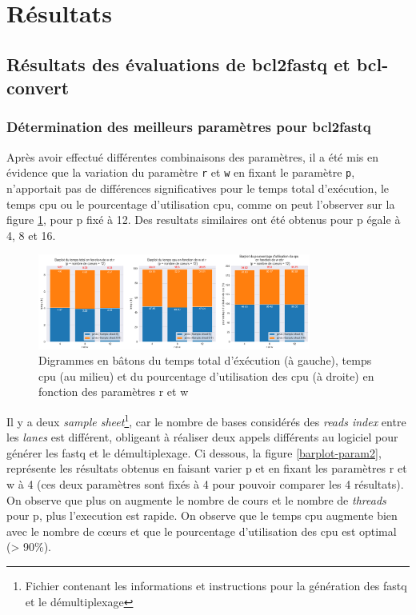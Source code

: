 \section{Résultats}
\subsection{Résultats des évaluations de bcl2fastq et bcl-convert}
\subsubsection{Détermination des meilleurs paramètres pour bcl2fastq}
Après avoir effectué différentes combinaisons des paramètres, il a été mis en évidence que la variation du paramètre \texttt{r} et \texttt{w} en fixant le paramètre \texttt{p}, n'apportait pas de différences significatives pour le temps total d'exécution, le temps cpu ou le pourcentage d'utilisation cpu, comme on peut l'observer sur la figure \ref{barplot-param}, pour p fixé à 12. Des resultats similaires ont été obtenus pour p égale à 4, 8 et 16. 

\begin{figure}[H]
    \centering
    \includegraphics[width=0.8\textwidth]{img/barplot_cum_jarvis2.png}
    \caption{\footnotesize{Digrammes en bâtons du temps total d'éxécution (à gauche), temps cpu (au milieu) et du pourcentage d'utilisation des cpu (à droite) en fonction des paramètres r et w}}
    \label{barplot-param}
\end{figure}
Il y a deux \emph{sample sheet}\footnote{Fichier contenant les informations et instructions pour la génération des fastq et le démultiplexage}, car le nombre de bases considérés des \emph{reads index} entre les \emph{lanes} est différent, obligeant à réaliser deux appels différents au logiciel pour générer les fastq et le démultiplexage. Ci dessous, la figure \ref{barplot-param2}, représente les résultats obtenus en faisant varier p et en fixant les paramètres r et w à 4 (ces deux paramètres sont fixés à 4 pour pouvoir comparer les 4 résultats). On observe que plus on augmente le nombre de cours et le nombre de \emph{threads} pour p, plus l'execution est rapide. On observe que le temps cpu augmente bien avec le nombre de cœurs et que le pourcentage d'utilisation des cpu est optimal (> 90\%).

